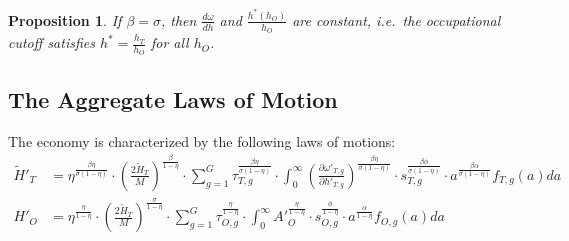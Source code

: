 \documentclass[onehalfspacing,11pt]{article}
\newtheorem{prp}{Proposition}
\begin{document}
\begin{prp}
If $\beta = \sigma$, then $\frac{d\omega}{dh}$ and $\frac{h^*(h_O)}{h_O}$ are constant, i.e.~the occupational cutoff satisfies $h^* = \frac{h_T}{h_O}$ for all $h_O$.
\end{prp}

\subsection{The Aggregate Laws of Motion}
The economy is characterized by the following laws of motions:%
\begin{align}
\widetilde{H}'_{T} & =\eta^{\frac{\beta\eta}{\sigma(1-\eta)}} \cdot \left(\tfrac{2\widetilde{H}_T}{M}\right)^{\frac{\beta}{1-\eta}} \cdot \sum_{g=1}^G \tau_{T,g}^\frac{\beta\eta}{\sigma(1-\eta)} \cdot \int_0^\infty \left( \tfrac{\partial \omega'_{T,g}}{\partial h'_{T,g}} \right)^\frac{\beta\eta}{\sigma(1-\eta)} \cdot s_{T,g}^\frac{\beta\phi}{\sigma(1-\eta)} \cdot a^\frac{\beta\alpha}{\sigma(1-\eta)}  f_{T,g}(a)da\\
{H}'_{O} & = \eta^\frac{\eta}{1-\eta} \cdot \left(\tfrac{2\widetilde{H}_T}{M}\right)^\frac{\sigma}{1-\eta}\cdot \sum_{g=1}^G \tau_{O,g}^\frac{\eta}{1-\eta} \cdot \int_0^\infty {A'}_O^\frac{\eta}{1-\eta} \cdot s_{O,g}^\frac{\phi}{1-\eta} \cdot a^{\frac{\alpha}{1-\eta}} f_{O,g}(a)da
\end{align}
\end{document}
